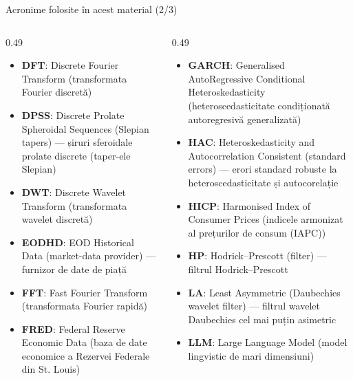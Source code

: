 \begin{frame}{Acronime folosite în acest material (2/3)}
\begin{columns}[T]
\begin{column}{0.49\textwidth}
\begin{itemize}\setlength{\itemsep}{0pt}
    \item \textbf{DFT}: Discrete Fourier Transform (transformata Fourier discretă)
    \item \textbf{DPSS}: Discrete Prolate Spheroidal Sequences (Slepian tapers) — șiruri sferoidale prolate discrete (taper-ele Slepian)
    \item \textbf{DWT}: Discrete Wavelet Transform (transformata wavelet discretă)
    \item \textbf{EODHD}: EOD Historical Data (market-data provider) — furnizor de date de piață
    \item \textbf{FFT}: Fast Fourier Transform (transformata Fourier rapidă)
    \item \textbf{FRED}: Federal Reserve Economic Data (baza de date economice a Rezervei Federale din St. Louis)
\end{itemize}
\end{column}
\begin{column}{0.49\textwidth}
\begin{itemize}\setlength{\itemsep}{0pt}
    \item \textbf{GARCH}: Generalised AutoRegressive Conditional Heteroskedasticity (heteroscedasticitate condiționată autoregresivă generalizată)
    \item \textbf{HAC}: Heteroskedasticity and Autocorrelation Consistent (standard errors) — erori standard robuste la heteroscedasticitate și autocorelație
    \item \textbf{HICP}: Harmonised Index of Consumer Prices (indicele armonizat al prețurilor de consum (IAPC))
    \item \textbf{HP}: Hodrick–Prescott (filter) — filtrul Hodrick–Prescott
    \item \textbf{LA}: Least Asymmetric (Daubechies wavelet filter) — filtrul wavelet Daubechies cel mai puțin asimetric
    \item \textbf{LLM}: Large Language Model (model lingvistic de mari dimensiuni)
\end{itemize}
\end{column}
\end{columns}
\end{frame}

